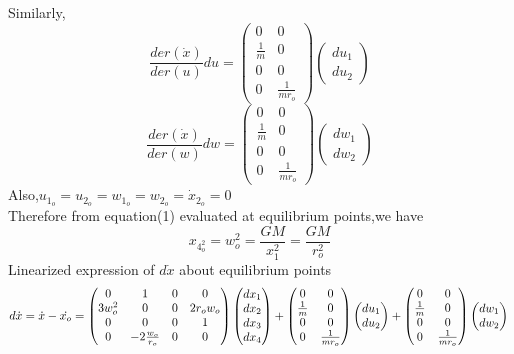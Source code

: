 \documentclass[journal,onecolumn]{IEEEtran}
\begin{document}
Similarly,\\
\begin{equation}
\frac{der(\dot{x})}{der(u)}du=\begin{pmatrix}
0&0\\
\frac{1}{m}&0\\
0&0\\
0&\frac{1}{mr_o}
\end{pmatrix}
\begin{pmatrix}
du_1\\
du_2
\end{pmatrix}
\end{equation}
\begin{equation}
\frac{der(\dot{x})}{der(w)}dw=\begin{pmatrix}
0&0\\
\frac{1}{m}&0\\
0&0\\
0&\frac{1}{mr_o}
\end{pmatrix}
\begin{pmatrix}
dw_1\\
dw_2
\end{pmatrix}
\end{equation}
Also,$u_1_o=u_2_o=w_1_o=w_2_o=\dot{x}_2_o=0$\\
Therefore from equation(1) evaluated at equilibrium points,we have
\begin{equation}
   x_4_o^2=w_o^2=\frac{GM}{x_1^2}=\frac{GM}{r_o^2} 
\end{equation}
Linearized expression of $d\dot{x}$ about equilibrium points\\
\begin{equation}
d\dot{x}=\dot{x}-\dot{x_o}=\begin{pmatrix}
0&1&0&0\\
3w_o^2&0&0&2r_ow_o\\
0&0&0&1\\
0&-2\frac{w_o}{r_o}&0&0
\end{pmatrix}\begin{pmatrix}
dx_1\\
dx_2\\
dx_3\\
dx_4
\end{pmatrix}+\begin{pmatrix}
0&0\\
\frac{1}{m}&0\\
0&0\\
0&\frac{1}{mr_o}
\end{pmatrix}
\begin{pmatrix}
du_1\\
du_2
\end{pmatrix}
+\begin{pmatrix}
0&0\\
\frac{1}{m}&0\\
0&0\\
0&\frac{1}{mr_o}
\end{pmatrix}
\begin{pmatrix}
dw_1\\
dw_2
\end{pmatrix}\\
\end{equation}
\end{document}
